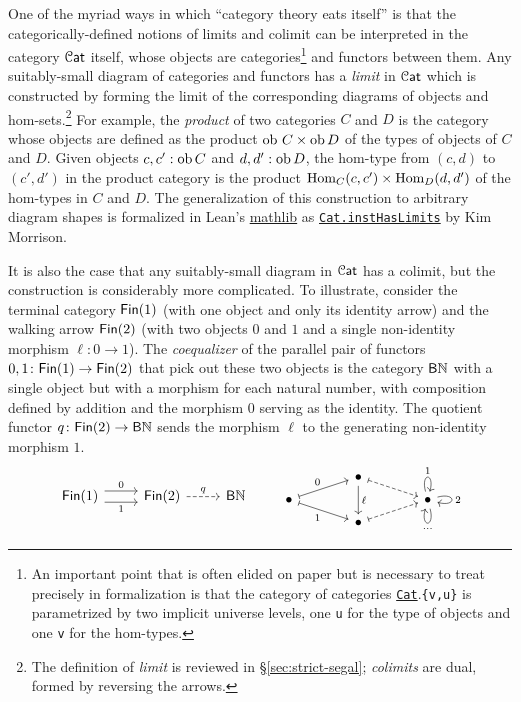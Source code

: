 \documentclass[a4paper,UKenglish,cleveref, autoref, thm-restate]{lipics-v2021}
\newcommand{\ob}{\textup{ob}}
\newcommand{\Hom}{\textup{Hom}}
\newcommand{\cat}[1]{\textup{\textsf{#1}}}%
\newcommand{\NN}{\mathbb{N}}
\newcommand{\1}{\mathbbe{1}}
\newcommand{\2}{\mathbbe{2}}
\newcommand{\3}{\mathbbe{3}}
\newcommand{\Fin}{\cat{Fin}}
\newcommand{\Cat}{\mathcal{C}\cat{at}}
\newcommand{\libmathlib}{\href{https://github.com/leanprover-community/mathlib}{\textsf{mathlib}}}
\newcommand{\cdoc}[2][]{\href{https://leanprover-community.github.io/mathlib4_docs/find/?pattern=CategoryTheory.#1#2\#doc}{\texttt{#2}}}
\begin{document}
One of the myriad ways in which ``category theory eats itself'' is that the categorically-defined notions of limits and colimit can be interpreted in the category $\Cat$ itself, whose objects are categories\footnote{An important point that is often elided on paper but is necessary to treat precisely in formalization is that the category of categories \cdoc{Cat}.\texttt{\{v,u\}} is parametrized by two implicit universe levels, one \texttt{u} for the type of objects and one \texttt{v} for the hom-types.} and functors between them. Any suitably-small diagram of categories and functors has a \emph{limit} in $\Cat$ which is constructed by forming the limit of the corresponding diagrams of objects and hom-sets.\footnote{The definition of \emph{limit} is reviewed in \S\ref{sec:strict-segal}; \emph{colimits} are dual, formed by reversing the arrows.} For example, the \emph{product} of two categories $C$ and $D$ is the category whose objects are defined as the product $\ob\,\,C \times \ob\,D$ of the types of objects of $C$ and $D$. Given objects $c,c' : \ob\,C$ and $d,d' : \ob\,D$, the hom-type from $(c,d)$ to $(c',d')$ in the product category is the product $\Hom_C(c,c') \times \Hom_D(d,d')$ of the hom-types in $C$ and $D$.
The generalization of this construction to arbitrary diagram shapes is formalized in Lean's \libmathlib{} as \cdoc{Cat.instHasLimits} by Kim Morrison.

It is also the case that any suitably-small diagram in $\Cat$ has a colimit, but the construction is considerably more complicated. To illustrate, consider the terminal category $\Fin(1)$ (with one object and only its identity arrow) and the walking arrow $\Fin(2)$ (with two objects $0$ and $1$ and a single non-identity morphism $\ell \colon 0 \to 1$). The \emph{coequalizer} of the parallel pair of functors $0,1 \colon \Fin(1) \to \Fin(2)$ that pick out these two objects is the category $\cat{B}\NN$ with a single object but with a morphism for each natural number, with composition defined by addition and the morphism $0$ serving as the identity. The quotient functor $q \colon \Fin(2) \to \cat{B}\NN$ sends the morphism $\ell$ to the generating non-identity morphism $1$.
\[ \begin{tikzcd} \Fin(1) \arrow[r, shift left=.4em, "0"] \arrow[r, shift right=.4em, "1"'] & \Fin(2) \arrow[r, dashed, "q"] & \cat{B}\NN \end{tikzcd}  \qquad  \begin{tikzcd}[row sep=tiny, column sep=large] & \bullet \arrow[dd, "\ell"] \arrow[dr, mapsto, dashed]\\ \bullet \arrow[ur, mapsto, "0"] \arrow[dr, mapsto, "1"'] & & \bullet  \arrow[loop above, "1"] \arrow[loop below, "\cdots"] \arrow[loop right, "2"]  \\ & \bullet \arrow[ur, mapsto, dashed]\end{tikzcd} \]
\end{document}

